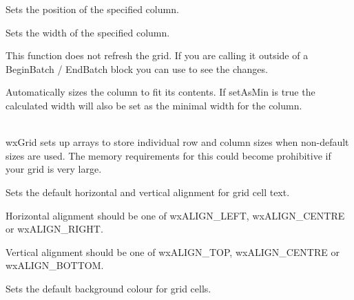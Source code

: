 \label{wxgridsetcolpos}


Sets the position of the specified column.



\label{wxgridsetcolsize}


Sets the width of the specified column.

This function does not refresh the grid. If you are calling it outside of a BeginBatch / EndBatch
block you can use  to see the changes.

Automatically sizes the column to fit its contents. If setAsMin is true the calculated width will
also be set as the minimal width for the column.

\\
wxGrid sets up arrays to store individual row and column sizes when non-default sizes are used.
The memory requirements for this could become prohibitive if your grid is very large.



\label{wxgridsetdefaultcellalignment}


Sets the default horizontal and vertical alignment for grid cell text.

Horizontal alignment should be one of wxALIGN\_LEFT, wxALIGN\_CENTRE or wxALIGN\_RIGHT.

Vertical alignment should be one of wxALIGN\_TOP, wxALIGN\_CENTRE or wxALIGN\_BOTTOM.



\label{wxgridsetdefaultcellbackgroundcolour}


Sets the default background colour for grid cells.



\label{wxgridsetdefaultcellfont}


